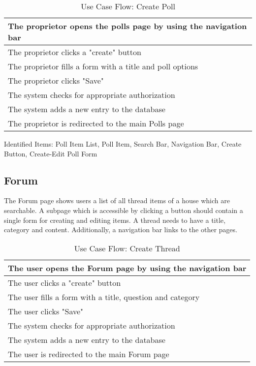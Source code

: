 \begin{table}[H]
  \begin{tabularx}{\linewidth}{|X|}
    \hline
     The proprietor opens the polls page by using the navigation bar \\
     \hline
     The proprietor clicks a "create" button \\
     \hline
     The proprietor fills a form with a title and poll options \\
     \hline
     The proprietor clicks "Save" \\
     \hline
     The system checks for appropriate authorization \\
     \hline
     The system adds a new entry to the database \\
     \hline
     The proprietor is redirected to the main Polls page \\
     \hline 
  \end{tabularx}
  \caption{Use Case Flow: Create Poll}
\end{table}

Identified Items: Poll Item List, Poll Item, Search Bar, Navigation Bar, Create Button, Create-Edit Poll Form

\subsection{Forum}
The Forum page shows users a list of all thread items of a house which are searchable. A subpage which is accessible by clicking a button should contain a single form for creating and editing items. A thread needs to have a title, category and content. Additionally, a navigation bar links to the other pages.

\begin{table}[H]
  \begin{tabularx}{\linewidth}{|X|}
    \hline
     The user opens the Forum page by using the navigation bar \\
     \hline
     The user clicks a "create" button \\
     \hline
     The user fills a form with a title, question and category \\
     \hline
     The user clicks "Save" \\
     \hline
     The system checks for appropriate authorization \\
     \hline
     The system adds a new entry to the database \\
     \hline
     The user is redirected to the main Forum page \\
     \hline 
  \end{tabularx}
  \caption{Use Case Flow: Create Thread}
\end{table}

